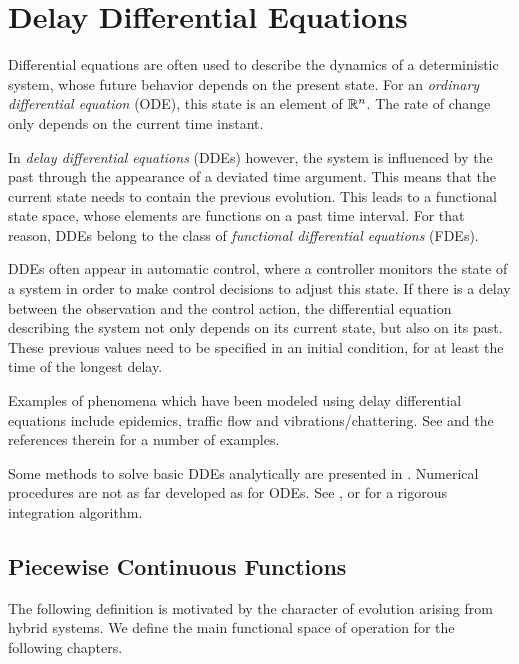 \chapter{Delay Differential Equations}

Differential equations are often used to describe the dynamics of a deterministic system, whose future behavior depends on the present state.
For an \emph{ordinary differential equation} (ODE), this state is an element of $\mathbb{R}^n$. The rate of change only depends on the current time instant.

In \emph{delay differential equations} (DDEs) however, the system is influenced by the past through the appearance of a deviated time argument. This means that the current state needs to contain the previous evolution.
This leads to a functional state space, whose elements are functions on a past time interval.
For that reason, DDEs belong to the class of \emph{functional differential equations} (FDEs).

DDEs often appear in automatic control, where a controller monitors the state of a system in order to make control decisions to adjust this state.
If there is a delay between the observation and the control action, the differential equation describing the system not only depends on its current state, but also on its past.
These previous values need to be specified in an initial condition, for at least the time of the longest delay.


Examples of phenomena which have been modeled using delay differential equations include epidemics, traffic flow and vibrations/chattering. See \cite{Falbo06FDEs} and the references therein for a number of examples.

Some methods to solve basic DDEs analytically are presented in \cite{Falbo06FDEs}. Numerical procedures are not as far developed as for ODEs.
See \cite{Bellen13NumericalDDEs}, or \cite{Szczlina14RigorousDDEs} for a rigorous integration algorithm.

\section{Piecewise Continuous Functions}
    \label{sec:piecewise-continuous-functions}

    The following definition is motivated by the character of evolution arising from hybrid systems. We define the main functional space of operation for the following chapters.

